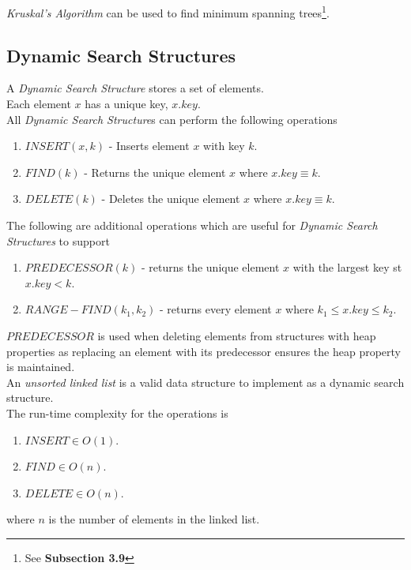 \documentclass[11pt,a4paper]{article}
\begin{document}
\textit{Kruskal's Algorithm} can be used to find minimum spanning trees\footnote{See  \textbf{Subsection 3.9}}.

\subsection{Dynamic Search Structures}

A \textit{Dynamic Search Structure} stores a set of elements.\\
Each element $x$ has a unique key, $x.key$.\\
All \textit{Dynamic Search Structure}s can perform the following operations 
\begin{enumerate}[label=\roman*)]
  \item $INSERT(x,k)$ - Inserts element $x$ with key $k$.
  \item $FIND(k)$ - Returns the unique element $x$ where $x.key\equiv k$.
  \item $DELETE(k)$ - Deletes the unique element $x$ where $x.key\equiv k$.
\end{enumerate}

The following are additional operations which are useful for \textit{Dynamic Search Structures} to support
\begin{enumerate}[label=\roman*)]
  \item $PREDECESSOR(k)$ - returns the unique element $x$ with the largest key st $x.key<k$.
  \item $RANGE-FIND(k_1,k_2)$ - returns every element $x$ where $k_1\leq x.key\leq k_2$.
\end{enumerate}

$PREDECESSOR$ is used when deleting elements from structures with heap properties as replacing an element with its predecessor ensures the heap property is maintained.\\

An \textit{unsorted linked list} is a valid data structure to implement as a dynamic search structure.\\
The run-time complexity for the operations is
\begin{enumerate}[label=\roman*)]
  \item $INSERT\in O(1)$.
  \item $FIND\in O(n)$.
  \item $DELETE\in O(n)$.
\end{enumerate}
where $n$ is the number of elements in the linked list.\\
\end{document}
